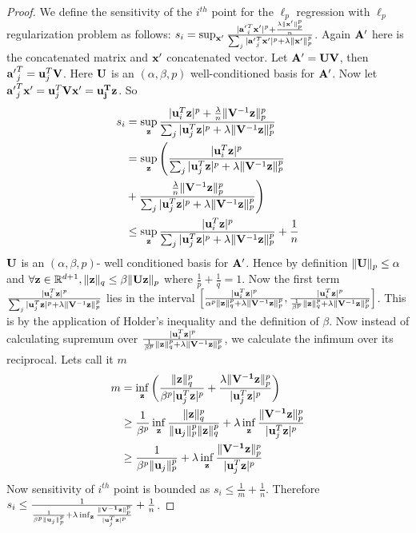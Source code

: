\begin{proof}
We define the sensitivity of the $i^{th}$ point for the $\ell_p$ regression with $\ell_p$ regularization  problem as follows:
$
s_i = \sup_\mathbf{x'}  \frac{|\mathbf{a'}_i^T\mathbf{x'}|^p + \frac{\lambda\|\mathbf{x'}\|_p^p}{n}}{ \sum_{j}|\mathbf{a'}_j^T\mathbf{x'}|^p +\lambda\|\mathbf{x'}\|_p^p}$.
Again $\mathbf{A'}$ here is the concatenated matrix and $\mathbf{x'}$ concatenated vector. Let $\mathbf{A'}=\mathbf{UV}$, then $\mathbf{a'}_j^T=\mathbf{u}_j^T\mathbf{V}$. Here $\mathbf{U}$ is an $(\alpha,\beta,p)$ well-conditioned basis for $\mathbf{A'}$. Now let $\mathbf{a'}_j^T\mathbf{x'}=\mathbf{u}_j^T\mathbf{Vx'}= \mathbf{{u}_j^T\mathbf{z}}$. So
\begin{equation*}
\begin{split}
s_{i} &= \sup_\mathbf{z}  \frac{|\mathbf{u}_i^T\mathbf{z}|^p + \frac{\lambda}{n}\|\mathbf{V}^{-1}\mathbf{z}\|_p^p}{\sum_{j}|\mathbf{u}_j^T\mathbf{z}|^p +\lambda\|\mathbf{V}^{-1}\mathbf{z}\|_p^p}\\
&= \sup_\mathbf{z}\Bigg( \frac{|\mathbf{u}_i^T\mathbf{z}|^p}{\sum_{j}|\mathbf{u}_j^T\mathbf{z}|^p +\lambda\|\mathbf{V}^{-1}\mathbf{z}\|_p^p} \\ 
&+ \frac{\frac{\lambda}{n}\|\mathbf{V}^{-1}\mathbf{z}\|_p^p}{\sum_{j}|\mathbf{u}_j^T\mathbf{z}|^p +\lambda\|\mathbf{V}^{-1}\mathbf{z}\|_p^p}\Bigg)\\
&\leq \sup_\mathbf{z}  \frac{|\mathbf{u}_i^T\mathbf{z}|^p}{\sum_{j}|\mathbf{u}_j^T\mathbf{z}|^p +\lambda\|\mathbf{V}^{-1}\mathbf{z}\|_p^p} + \frac{1}{n}
\end{split}
\end{equation*}
$\mathbf{U}$ is an $(\alpha,\beta,p)$- well conditioned basis for $\mathbf{A'}$. Hence by definition $\|\mathbf{U}\|_p \leq \alpha$ and $\forall \mathbf{z} \in \mathbb{R}^{d+1}, \|\mathbf{z}\|_q  \leq \beta \|\mathbf{U}\mathbf{z}\|_p $ where $\frac{1}{p}+\frac{1}{q}=1$. Now the first term $\frac{|\mathbf{u}_i^T\mathbf{z}|^p}{\sum_{j}|\mathbf{u}_j^T\mathbf{z}|^p +\lambda\|\mathbf{V}^{-1}\mathbf{z}\|_p^p}$ lies in the interval $\Big[\frac{|\mathbf{u}_i^T\mathbf{z}|^p}{\alpha^p\|\mathbf{z}\|_q^p +\lambda\|\mathbf{V}^{-1}\mathbf{z}\|_p^p},\frac{|\mathbf{u}_i^T\mathbf{z}|^p}{\frac{1}{\beta^p}\|\mathbf{z}\|_q^p +\lambda\|\mathbf{V}^{-1}\mathbf{z}\|_p^p}\Big]$. This is by the application of Holder's inequality and the definition of $\beta$. Now instead of calculating supremum over  $\frac{|\mathbf{u}_i^T\mathbf{z}|^p}{\frac{1}{\beta^p}\|\mathbf{z}\|_q^p +\lambda\|\mathbf{V}^{-1}\mathbf{z}\|_p^p}$, we calculate the infimum over its reciprocal. Lets call it $m$
\begin{equation*}
\begin{split}
m&=\inf_{\mathbf{z}} \bigg(\frac{\|\mathbf{z}\|_q^p}{\beta^p|\mathbf{u}_j^T\mathbf{z}|^p} + \frac{\lambda\|\mathbf{V^{-1}z}\|_p^p}{|\mathbf{u}_j^T\mathbf{z}|^p}\bigg)\\
&\geq \frac{1}{\beta^p} \inf_{\mathbf{z}}\frac{\|\mathbf{z}\|_q^p}{\|\mathbf{u}_j\|_p^p\|\mathbf{z}\|_q^p} + 
\lambda \inf_{\mathbf{z}}\frac{\|\mathbf{V^{-1}z}\|_p^p}{|\mathbf{u}_j^T\mathbf{z}|^p}\\
&\geq \frac{1}{\beta^p\|\mathbf{u}_j\|_p^p} + \lambda \inf_{\mathbf{z}}\frac{\|\mathbf{V^{-1}z}\|_p^p}{|\mathbf{u}_j^T\mathbf{z}|^p}
\end{split}
\end{equation*}
Now sensitivity of $i^{th}$ point is bounded as $s_i \leq \frac{1}{m} +\frac{1}{n}$. Therefore $s_i \leq \frac{1}{\frac{1}{\beta^p\|\mathbf{u}_j\|_p^p} + \lambda  \inf_{\mathbf{z}}\frac{\|\mathbf{V^{-1}z}\|_p^p}{|\mathbf{u}_j^T\mathbf{z}|^p}} + \frac{1}{n}$. 


\end{proof}
